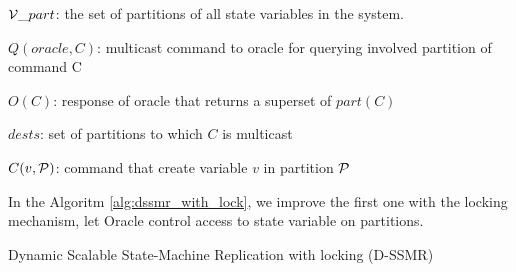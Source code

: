 \begin{algorithm}
\begin{distribalgo}[1]
$\mathcal{V}\_part$: the set of partitions of all state variables in the system.

\vspace{1mm}

$Q(oracle, C)$: multicast command to oracle for querying involved partition of command C

\vspace{1mm}

$O(C)$: response of oracle that returns a superset of $part(C)$

\vspace{1mm}

$dests$: set of partitions to which $C$ is multicast

\vspace{1mm}

$C(v, \mathcal{P})$: command that create variable $v$ in partition $\mathcal{P}$


In the Algoritm \ref{alg:dssmr_with_lock}, we improve the first one with the locking mechanism, let Oracle control access to state variable on partitions. 

\caption{Dynamic Scalable State-Machine Replication with locking (D-SSMR)}
\label{alg:dssmr_with_lock}
\end{distribalgo}
\end{algorithm}


